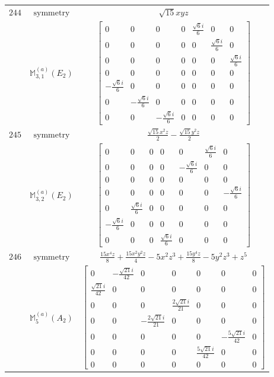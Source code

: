 \documentclass[fleqn,8pt,landscape]{jsarticle}
\begin{document}
\begin{longtable}{ccc}
$ 244 $ & $ \text{symmetry} $ & $ \sqrt{15} x y z $ \\
$  $ & $ \mathbb{M}_{3,1}^{(a)}(E_{2}) $ & $ \begin{bmatrix} 0 & 0 & 0 & 0 & \frac{\sqrt{6} i}{6} & 0 & 0 \\ 0 & 0 & 0 & 0 & 0 & \frac{\sqrt{6} i}{6} & 0 \\ 0 & 0 & 0 & 0 & 0 & 0 & \frac{\sqrt{6} i}{6} \\ 0 & 0 & 0 & 0 & 0 & 0 & 0 \\ - \frac{\sqrt{6} i}{6} & 0 & 0 & 0 & 0 & 0 & 0 \\ 0 & - \frac{\sqrt{6} i}{6} & 0 & 0 & 0 & 0 & 0 \\ 0 & 0 & - \frac{\sqrt{6} i}{6} & 0 & 0 & 0 & 0 \end{bmatrix} $ \\ \hline
$ 245 $ & $ \text{symmetry} $ & $ \frac{\sqrt{15} x^{2} z}{2} - \frac{\sqrt{15} y^{2} z}{2} $ \\
$  $ & $ \mathbb{M}_{3,2}^{(a)}(E_{2}) $ & $ \begin{bmatrix} 0 & 0 & 0 & 0 & 0 & \frac{\sqrt{6} i}{6} & 0 \\ 0 & 0 & 0 & 0 & - \frac{\sqrt{6} i}{6} & 0 & 0 \\ 0 & 0 & 0 & 0 & 0 & 0 & 0 \\ 0 & 0 & 0 & 0 & 0 & 0 & - \frac{\sqrt{6} i}{6} \\ 0 & \frac{\sqrt{6} i}{6} & 0 & 0 & 0 & 0 & 0 \\ - \frac{\sqrt{6} i}{6} & 0 & 0 & 0 & 0 & 0 & 0 \\ 0 & 0 & 0 & \frac{\sqrt{6} i}{6} & 0 & 0 & 0 \end{bmatrix} $ \\ \hline
$ 246 $ & $ \text{symmetry} $ & $ \frac{15 x^{4} z}{8} + \frac{15 x^{2} y^{2} z}{4} - 5 x^{2} z^{3} + \frac{15 y^{4} z}{8} - 5 y^{2} z^{3} + z^{5} $ \\
$  $ & $ \mathbb{M}_{5}^{(a)}(A_{2}) $ & $ \begin{bmatrix} 0 & - \frac{\sqrt{21} i}{42} & 0 & 0 & 0 & 0 & 0 \\ \frac{\sqrt{21} i}{42} & 0 & 0 & 0 & 0 & 0 & 0 \\ 0 & 0 & 0 & \frac{2 \sqrt{21} i}{21} & 0 & 0 & 0 \\ 0 & 0 & - \frac{2 \sqrt{21} i}{21} & 0 & 0 & 0 & 0 \\ 0 & 0 & 0 & 0 & 0 & - \frac{5 \sqrt{21} i}{42} & 0 \\ 0 & 0 & 0 & 0 & \frac{5 \sqrt{21} i}{42} & 0 & 0 \\ 0 & 0 & 0 & 0 & 0 & 0 & 0 \end{bmatrix} $ \\ \hline

\end{longtable}
\end{document}
